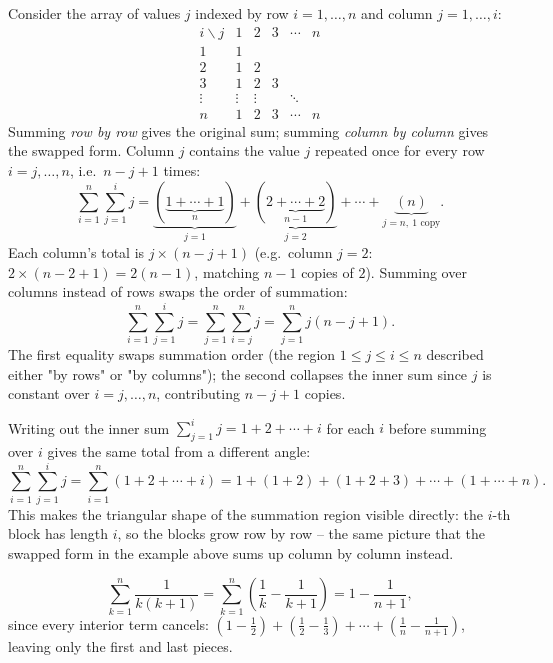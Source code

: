 \documentclass[11pt]{article}
\begin{document}
\begin{example}
Consider the array of values $j$ indexed by row $i=1,\dots,n$ and column $j=1,\dots,i$:
\[
\begin{array}{c|ccccc}
i \backslash j & 1 & 2 & 3 & \cdots & n \\\hline
1 & 1 & & & & \\
2 & 1 & 2 & & & \\
3 & 1 & 2 & 3 & & \\
\vdots & \vdots & \vdots & & \ddots & \\
n & 1 & 2 & 3 & \cdots & n
\end{array}
\]
Summing \emph{row by row} gives the original sum; summing \emph{column by column} gives the swapped form. Column $j$ contains the value $j$ repeated once for every row $i=j,\dots,n$, i.e.\ $n-j+1$ times:
\[
\sum_{i=1}^{n}\sum_{j=1}^{i} j
= \underbrace{(\underbrace{1+\cdots+1}_{n})}_{j=1} + \underbrace{(\underbrace{2+\cdots+2}_{n-1})}_{j=2} + \cdots + \underbrace{(n)}_{j=n,\ 1\text{ copy}}.
\]
Each column's total is $j\times(n-j+1)$ (e.g.\ column $j=2$: $2\times(n-2+1)=2(n-1)$, matching $n-1$ copies of $2$). Summing over columns instead of rows swaps the order of summation:
\[
\sum_{i=1}^{n}\sum_{j=1}^{i} j = \sum_{j=1}^{n}\sum_{i=j}^{n} j = \sum_{j=1}^n j(n-j+1).
\]
The first equality swaps summation order (the region $1\le j\le i\le n$ described either "by rows" or "by columns"); the second collapses the inner sum since $j$ is constant over $i=j,\dots,n$, contributing $n-j+1$ copies.
\end{example}

\begin{example}
Writing out the inner sum $\sum_{j=1}^i j = 1+2+\cdots+i$ for each $i$ before summing over $i$ gives the same total from a different angle:
\[
\sum_{i=1}^{n}\sum_{j=1}^{i} j = \sum_{i=1}^n(1+2+\cdots+i) = 1+(1+2)+(1+2+3)+\cdots+(1+\cdots+n).
\]
This makes the triangular shape of the summation region visible directly: the $i$-th block has length $i$, so the blocks grow row by row -- the same picture that the swapped form in the example above sums up column by column instead.
\end{example}

\begin{example}
\[
\sum_{k=1}^n \frac{1}{k(k+1)} = \sum_{k=1}^n\left(\frac1k-\frac1{k+1}\right) = 1-\frac1{n+1},
\]
since every interior term cancels: $\left(1-\tfrac12\right)+\left(\tfrac12-\tfrac13\right)+\cdots+\left(\tfrac1n-\tfrac1{n+1}\right)$, leaving only the first and last pieces.
\end{example}
\end{document}
